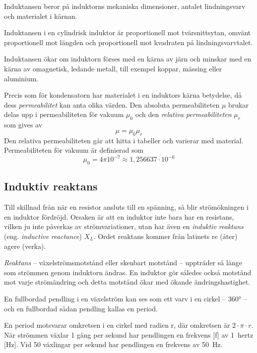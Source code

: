 Induktansen beror på induktorns mekaniska dimensioner, antalet lindningsvarv och
materialet i kärnan.

Induktansen i en cylindrisk induktor är proportionell mot tvärsnittsytan, omvänt
proportionell mot längden och proportionell mot kvadraten på lindningsvarvtalet.

Induktansen ökar om induktorn förses med en kärna av järn och minskar med en
kärna av omagnetisk, ledande metall, till exempel koppar, mässing eller aluminium.

Precis som för kondensatorn har materialet i en induktors kärna betydelse,
då dess \emph{permeabilitet} kan anta olika värden. Den absoluta permeabiliteten
\(\mu\) brukar delas upp i permeabiliteten för vakuum \(\mu_0\) och den
\emph{relativa permeabiliteten} \(\mu_r\) som gives av
\[\mu = \mu_0\mu_r\]
Den relativa permeabiliteten går att hitta i tabeller och varierar med material.
Permeabiliteten för vakuum är definierad som
\[\mu_0 = 4\pi 10^{-7} \approx 1,256637 \cdot 10^{-6}\]

\subsection{Induktiv reaktans}
\label{induktiv_reaktans} 

Till skillnad från när en resistor ansluts till en spänning, så blir
strömökningen i en induktor fördröjd. Orsaken är att en induktor inte bara har
en resistans, vilken ju inte påverkas av strömvariationer, utan har även en
\emph{induktiv reaktans} (eng. \emph{inductive reactance}) \(X_L\).
Ordet reaktans kommer från latinets re (åter) agere (verka).

\emph{Reaktans} -- växelströmsmotstånd eller skenbart motstånd -- uppträder så
länge som strömmen genom induktorn ändras. En induktor gör således också
motstånd mot varje strömändring och detta motstånd ökar med ökande
ändringshastighet.

En fullbordad pendling i en växelström kan ses som ett varv i en cirkel --
\ang{360} -- och en fullbordad sådan pendling kallas en period.

En period motsvarar omkretsen i en cirkel med radien r, där omkretsen är
\(2 \cdot \pi  \cdot r\). När strömmen växlar 1 gång per sekund har
pendlingen en frekvens [f] av 1~hertz [Hz].
Vid 50 växlingar per sekund har pendlingen en frekvens av \SI{50}{\hertz}.

